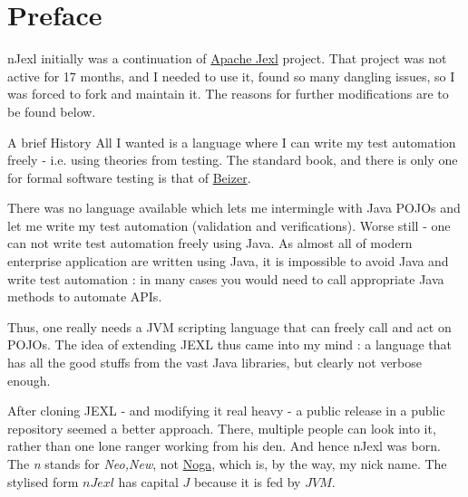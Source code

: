 \chapter{Preface}
 
{\LARGE n}Jexl initially was a continuation of \href{http://commons.apache.org/proper/commons-jexl}{Apache Jexl} project.
That project was not active for 17 months, and I needed to use it, found so many dangling issues, 
so I was forced to fork and maintain it. The reasons for further modifications are to be found below.

\begin{subsection}{A brief History}
All I wanted is a language where I can write my test automation freely - i.e. using theories from testing.
The standard book, and there is only one for formal software testing is 
that of \href{http://www.amazon.com/Software-Testing-Techniques-2nd-Edition/dp/1850328803}{Beizer}.

There was no language available which lets me intermingle with Java POJOs and let me write my test automation (validation and verifications). 
Worse still - one can not write test automation freely using Java. 
As almost all of modern enterprise application are written using Java, it is impossible to avoid Java 
and write test automation : in many cases you would need to call appropriate Java methods to automate APIs.

Thus, one really needs a JVM scripting language that can freely call and act on POJOs.
The idea of extending JEXL thus came into my mind : a language that has all the good stuffs from
the vast Java libraries, but clearly not verbose enough.

After cloning JEXL - and modifying it real heavy - a public release in a public repository
seemed a better approach. There, multiple people can look into it, rather than one lone ranger working from his den.
And hence nJexl was born. The \emph{n} stands for \emph{Neo,New}, 
not \href{https://nmandalh.wordpress.com}{Noga}, which is, by the way, my nick name.
The stylised form $nJexl$ has capital $J$ because it is fed by $JVM$.

\end{subsection}

